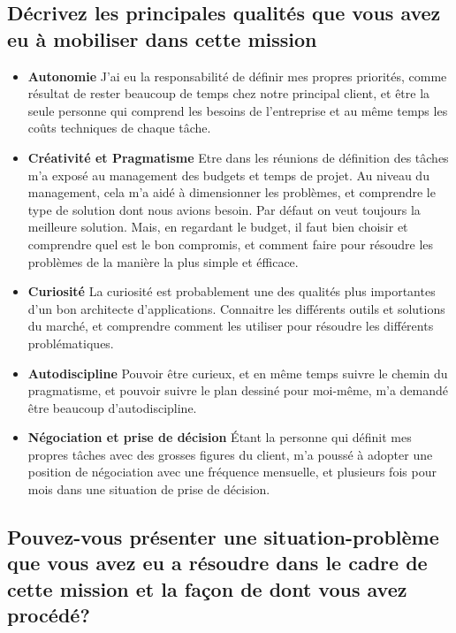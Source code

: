 \documentclass{resume} %
\begin{document}
	\subsection{Décrivez les principales qualités que vous avez eu \`a mobiliser dans cette mission}
	
		\begin{itemize} 				
			\item \textbf{Autonomie} \newline
				J'ai eu la responsabilité de d\'efinir mes propres priorités, comme résultat de rester beaucoup de temps chez notre principal client, et être la seule personne qui comprend les besoins de l'entreprise et au même temps les co\^uts techniques de chaque tâche.
			\item \textbf{Créativité et Pragmatisme } \newline
				Etre dans les réunions de définition des tâches m'a exposé au management des budgets et temps de projet. Au niveau du management, cela m'a aidé \`a  dimensionner les problèmes, et comprendre le type de solution dont nous avions  besoin. Par défaut on veut toujours la meilleure solution. Mais, en regardant le budget, il faut bien choisir et comprendre quel est le bon compromis, et comment faire pour résoudre  les problèmes de la mani\`ere la plus simple et \'efficace. 
			\item \textbf{Curiosité } \newline
				La curiosité est probablement une des qualités plus importantes d'un bon architecte d'applications. Connaitre les différents outils et solutions du marché, et comprendre comment les utiliser pour résoudre les différents problématiques.
			\item \textbf{Autodiscipline} \newline
			Pouvoir être curieux, et en même temps suivre le chemin du pragmatisme, et pouvoir suivre le plan dessin\'e pour moi-même, m'a demandé être  beaucoup d'autodiscipline.
			\item \textbf{Négociation  et prise de décision } \newline
				Étant la personne qui définit mes propres tâches avec des grosses figures du client, m'a poussé \`a adopter une position de négociation avec une fréquence mensuelle, et plusieurs fois pour mois dans une situation de prise de décision.  
		\end{itemize}
		
	\subsection{Pouvez-vous présenter une situation-problème que vous avez eu a résoudre dans le cadre de cette mission et la façon de dont vous avez procédé?}
	
\end{document}
